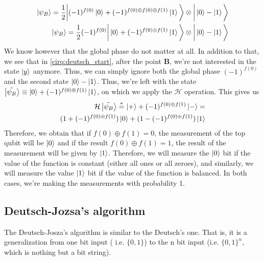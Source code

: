 \begin{align}
\ket{\psi_B} = \frac{1}{2} \bigg| (-1)^{f(0)}\ket{0} + (-1)^{f(0)\oplus f(0)\oplus f(1)}\ket{1} \bigg \rangle \otimes \bigg| \ket{0} - \ket{1} \bigg \rangle \\
\ket{\psi_B} = \frac{1}{2} (-1)^{f(0)}\bigg| \ket{0} + (-1)^{f(0)\oplus f(1)}\ket{1} \bigg \rangle \otimes \bigg| \ket{0} - \ket{1} \bigg \rangle
\label{eq:deutsch_global_phase}
\end{align}
We know however that the global phase do not matter at all. In addition to that, we see that in \autoref{cirq:deutsch_start}, after the point \textbf{B},
we're not interested in the state $\ket{y}$ anymore. Thus, we can simply ignore both the global phase $(-1)^{f(0)}$ and the second state $\ket{0}-\ket{1}$.
Thus, we're left with the state $\ket{\tilde{\psi_B}}\equiv \ket{0} + (-1)^{f(0)\oplus f(1)}\ket{1}$, on which we apply the $\mathcal{H}$ operation.
This gives us 
\begin{align}
  \mathcal{H} \ket{\tilde{\psi_B}} \stackrel{*}{=} \ket{+} + (-1)^{f(0)\oplus f(1)}\ket{-}=\\
  (1+(-1)^{f(0)\oplus f(1)}) \ket{0} + (1-(-1)^{f(0)\oplus f(1)})\ket{1}
  \label{eq:deutsch_f_last}
\end{align}
Therefore, we obtain that if ${f(0)\oplus f(1)}=0$, the measurement of the top qubit will be $\ket{0}$ and if the result ${f(0)\oplus f(1)}=1$, the result of the 
measurement will be given by $\ket{1}$.
Therefore, we will measure the $\ket{0}$ bit if the value of the function is constant (either all ones or all zeroes), and similarly, we will measure the 
value $\ket{1}$ bit if the value of the function is balanced. In both cases, we're making the measurements with probability 1.

\subsection*{Deutsch-Jozsa's algorithm}
The Deutsch-Josza's algorithm is similar to the Deutsch's one. That is, it is a generalization from one bit input ( i.e. $\{0,1\}$) 
to the n bit input (i.e. $\{0,1\}^n$, which is nothing but a bit string).

